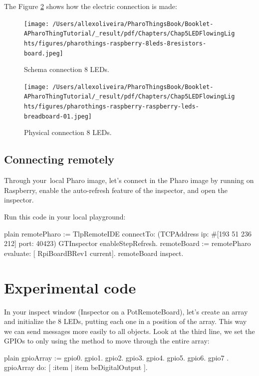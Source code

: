 \documentclass[10pt,twoside,english]{_support/latex/sbabook/sbabook}
\begin{document}
The Figure \ref{Physical8Leds} shows how the electric connection is made:


\begin{figure}

\begin{center}
\texttt{[image: /Users/allexoliveira/PharoThingsBook/Booklet-APharoThingTutorial/\_result/pdf/Chapters/Chap5LEDFlowingLights/figures/pharothings-raspberry-8leds-8resistors-board.jpeg]}\caption{Schema connection 8 LEDs.\label{Schema8Leds}}\end{center}
\end{figure}


\begin{figure}

\begin{center}
\texttt{[image: /Users/allexoliveira/PharoThingsBook/Booklet-APharoThingTutorial/\_result/pdf/Chapters/Chap5LEDFlowingLights/figures/pharothings-raspberry-raspberry-leds-breadboard-01.jpeg]}\caption{Physical connection 8 LEDs.\label{Physical8Leds}}\end{center}
\end{figure}

\subsection{Connecting remotely}
Through your local Pharo image, let's connect in the Pharo image by running on Raspberry, enable the auto-refresh feature of the inspector, and open the inspector.

Run this code in your local playground:

\begin{displaycode}{plain}
remotePharo := TlpRemoteIDE connectTo: (TCPAddress ip: #[193 51 236 212] port: 40423)
GTInspector enableStepRefresh.
remoteBoard := remotePharo evaluate: [ RpiBoardBRev1 current].
remoteBoard inspect.
\end{displaycode}
\section{Experimental code}
In your inspect window (Inspector on a PotRemoteBoard), let’s create an array and initialize the 8 LEDs, putting each one in a position of the array.  This way we can send messages more easily to all objects. Look at the third line, we set the GPIOs to  only using the method  to move through the entire array:

\begin{displaycode}{plain}
gpioArray := { gpio0. gpio1. gpio2. gpio3. gpio4. gpio5. gpio6. gpio7 }.
gpioArray do: [ :item | item beDigitalOutput ].
\end{displaycode}
\end{document}
